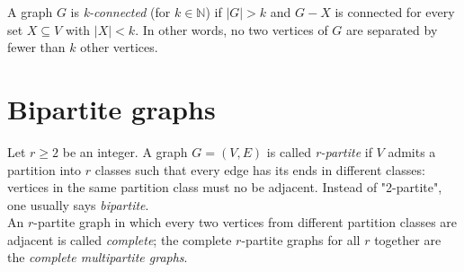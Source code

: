 		A graph $G$ is \textit{k-connected} (for $k \in \mathbb{N}$) if $|G| > k$ and $G - X$ is connected for every set $X \subseteq V$ with $|X| < k$. In other words, no two vertices of $G$ are separated by fewer than $k$ other vertices.
		
	\section{Bipartite graphs}
		Let $r \geq 2$ be an integer. A graph $G = (V, E)$ is called \textit{r-partite} if $V$ admits a partition into $r$ classes such that every edge has its ends in different classes: vertices in the same partition class must no be adjacent. Instead of "2-partite", one usually says \textit{bipartite}.\\
		
		An $r$-partite graph in which every two vertices from different partition classes are adjacent is called \textit{complete}; the complete $r$-partite graphs for all $r$ together are the \textit{complete multipartite graphs}.

